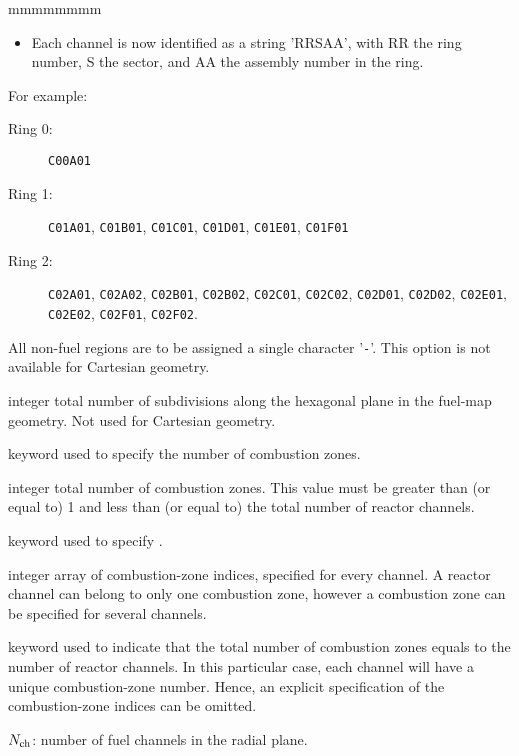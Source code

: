 \begin{ListeDeDescription}{mmmmmmmm}
\begin{itemize}
\item Each channel is now identified as a string 'RRSAA', with RR the ring number, S the sector, and AA the assembly number in the ring.
\end{itemize}

\noindent For example:
\begin{description}
\item[Ring 0:] {\tt C00A01}

\item[Ring 1:] {\tt C01A01}, {\tt C01B01}, {\tt C01C01}, {\tt C01D01}, {\tt C01E01}, {\tt C01F01}

\item[Ring 2:] {\tt C02A01}, {\tt C02A02}, {\tt C02B01}, {\tt C02B02}, {\tt C02C01}, {\tt C02C02}, {\tt C02D01}, {\tt C02D02}, {\tt C02E01}, {\tt C02E02}, {\tt C02F01}, {\tt C02F02}.
\end{description}

All non-fuel regions are to be assigned a single character '{\tt -}'.
This option is not available for  Cartesian geometry.

\item[\dusa{nh}] integer total number of subdivisions along the
hexagonal plane in the fuel-map geometry. Not used for  Cartesian
geometry.

\item[\moc{NCOMB}] keyword used to specify the number
of combustion zones.

\item[\dusa{ncomb}] integer total number of combustion zones.
This value must be greater than (or equal to) 1 and less than (or equal to)
the total number of reactor channels.

\item[\moc{B-ZONE}] keyword used to specify .

\item[\dusa{icz}] integer array of combustion-zone indices, specified
for every channel. A reactor channel can belong to only one combustion
zone, however a combustion zone can be specified for several channels.

\item[\moc{ALL}] keyword used to indicate that the total number
of combustion zones equals to the number of reactor channels. In
this particular case, each channel will have a unique combustion-zone
number. Hence, an explicit specification of the combustion-zone
indices can be omitted.

\item[\dusa{nch}] $N_{\rm ch}$: number of fuel channels in the radial plane.


\end{ListeDeDescription}
